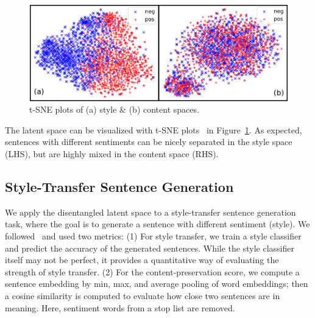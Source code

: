 \documentclass[11pt,a4paper]{article}
\begin{document}
\begin{table}[!t]
	\centering
	\caption{Style classification accuracy.}
	\label{tab:classification}
\end{table}

\begin{figure}[!t]
	\includegraphics[width=\linewidth]{tsne-style-and-content}
	\caption{t-SNE plots of (a) style \& (b) content spaces.}
	\label{fig:tsne}
\end{figure}


The latent space can be visualized with t-SNE plots~\cite{maaten2008visualizing} in Figure~\ref{fig:tsne}. As expected, sentences with different sentiments can be nicely separated in the style space (LHS), but are highly mixed in the content space (RHS).


\subsection{Style-Transfer Sentence Generation}

We apply the disentangled latent space to a style-transfer sentence generation task, where the goal is to generate a sentence with different sentiment (style). We followed~ and used two metrics: (1) For style transfer, we train a style classifier and predict the accuracy of the generated sentences. While the style classifier itself may not be perfect, it provides a quantitative way of evaluating the strength of style transfer. (2) For the content-preservation score, we compute a sentence embedding by min, max, and average pooling of word embeddings; then a cosine similarity is computed to evaluate how close two sentences are in meaning. Here, sentiment words from a stop list \cite{hu2004mining} are removed.
\end{document}

